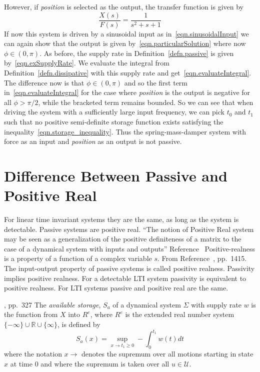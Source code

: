 \begin{example}
  However, if \textit{position} is selected as the output, the transfer function is given by
  \begin{equation*}
  \frac{X(s)}{F(s)} = \frac{1}{s^{2}+s+1}
  \end{equation*}
  If now this system is driven by a sinusoidal input as in~\eqref{eqn.sinusoidalInput} we can again show that the output is given by~\eqref{eqn.particularSolution} where now $\phi\in(0,\pi)$.
  As before, the supply rate in Definition~\ref{defn.passive} is given by~\eqref{eqn.exSupplyRate}.
  We evaluate the integral from Definition~\ref{defn.dissipative} with this supply rate and get~\eqref{eqn.evaluateIntegral}.
  The difference now is that $\phi\in(0,\pi)$ and so the first term in~\eqref{eqn.evaluateIntegral} for the case where \textit{position} is the output is negative for all $\phi>\pi/2$, while the bracketed term remains bounded.
  So we can see that when driving the system with a sufficiently large input frequency, we can pick $t_{0}$ and $t_{1}$ such that no positive semi-definite storage function exists satisfying the inequality~\eqref{eqn.storage_inequality}.
  Thus the spring-mass-damper system with force as an input and \textit{position} as an output is not passive.
\end{example}

\section{Difference Between Passive and Positive Real}

For linear time invariant systems they are the same, as long as the system is detectable.\cite{bao.process.2007}
Passive systems are positive real.
``The notion of Positive Real system may be seen as a generalization of the positive definiteness of a matrix to the case of a dynamical system with inputs and outputs'' Reference~\cite{lozano.dissipative.2000}
Positive-realness is a property of a function of a complex variable $s$.
From Reference~\cite{bao.process.2007}, pp.~14\textemdash{}15.
The input-output property of passive systems is called positive realness.
Passivity implies positive realness.
For a detectable LTI system passivity is equivalent to positive realness.
For LTI systems passive and positive real are the same.

\begin{defn-dan}\label{defn.available_storage}\cite{willems.part1.1972}, pp.~327
  The \textit{available storage}, $S_{a}$ of a dynamical system $\Sigma$ with supply rate $w$ is the function from $X$ into $R^{e}$, where $R^{e}$ is the extended real number system $\{-\infty\}\cup\mathbb{R}\cup\{\infty\}$, is defined by
  \begin{equation*}
    S_{a}(x) = \sup_{x\rightarrow t_{1}\geq 0} -\int_{0}^{t_{1}}w(t)dt
  \end{equation*}
  where the notation $x\rightarrow$ denotes the supremum over all motions starting in state $x$ at time $0$ and where the supremum is taken over all $u\in\mathcal{U}$.
\end{defn-dan}

